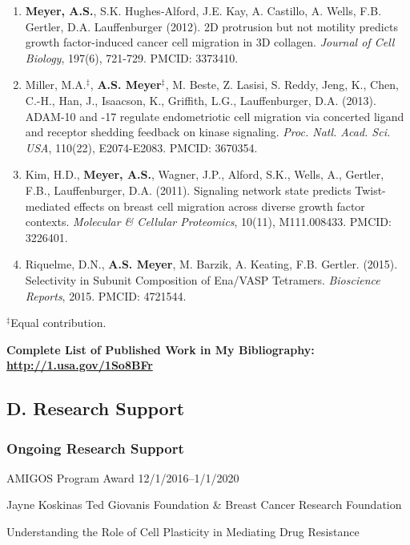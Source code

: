 \documentclass[11pt]{article}
\begin{document}
\begin{enumerate}
  \item \textbf{Meyer, A.S.}, S.K. Hughes-Alford, J.E. Kay, A. Castillo, A. Wells, F.B. Gertler, D.A. Lauffenburger (2012). 2D protrusion but not motility predicts growth factor-induced cancer cell migration in 3D collagen. \emph{Journal of Cell Biology}, 197(6), 721-729. PMCID: 3373410.
  \item Miller, M.A.$^\ddag$, \textbf{A.S. Meyer}$^\ddag$, M. Beste, Z. Lasisi, S. Reddy, Jeng, K., Chen, C.-H., Han, J., Isaacson, K., Griffith, L.G., Lauffenburger, D.A. (2013). ADAM-10 and -17 regulate endometriotic cell migration via concerted ligand and receptor shedding feedback on kinase signaling. \emph{Proc. Natl. Acad. Sci. USA}, 110(22), E2074-E2083. PMCID: 3670354.
  \item Kim, H.D., \textbf{Meyer, A.S.}, Wagner, J.P., Alford, S.K., Wells, A., Gertler, F.B., Lauffenburger, D.A. (2011). Signaling network state predicts Twist-mediated effects on breast cell migration across diverse growth factor contexts. \emph{Molecular \& Cellular Proteomics}, 10(11), M111.008433. PMCID: 3226401.
  \item Riquelme, D.N., \textbf{A.S. Meyer}, M. Barzik, A. Keating, F.B. Gertler. (2015). Selectivity in Subunit Composition of Ena/VASP Tetramers. \emph{Bioscience Reports}, 2015. PMCID: 4721544.
\end{enumerate}

\noindent $^\ddag$Equal contribution.




\textbf{Complete List of Published Work in My Bibliography: \url{http://1.usa.gov/1So8BFr}}





\subsection{D. Research Support}

\subsubsection{Ongoing Research Support}

AMIGOS Program Award  \hfill  12/1/2016--1/1/2020

Jayne Koskinas Ted Giovanis Foundation \& Breast Cancer Research Foundation

Understanding the Role of Cell Plasticity in Mediating Drug Resistance
\end{document}

